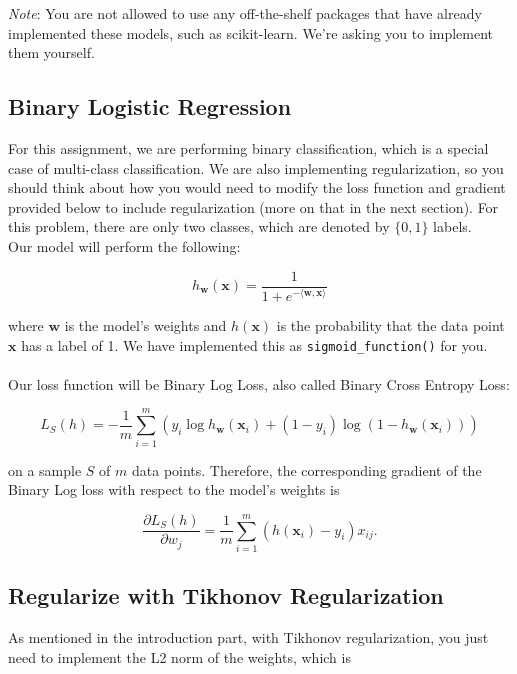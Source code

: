 \documentclass{article}
\begin{document}
\noindent\textit{Note}: You are not allowed to use any off-the-shelf packages that have already implemented these models, such as scikit-learn. We're asking you to implement them yourself.

\subsection*{Binary Logistic Regression}

For this assignment, we are performing binary classification, which is a special case of multi-class classification. We are also implementing regularization, so you should think about how you would need to modify the loss function and gradient provided below to include regularization (more on that in the next section). For this problem, there are only two classes, which are denoted by $\{0, 1\}$ labels. \\

\noindent Our model will perform the following: 

\begin{equation}
    h_\mathbf{w}(\mathbf{x}) = \frac{1}{1 + e^{-\langle\mathbf{w}, \mathbf{x}\rangle}}
    \label{eq:sigmoid}
\end{equation}

\noindent where $\mathbf{w}$ is the model's weights and $h(\mathbf{x})$ is the probability that the data point $\mathbf{x}$ has a label of 1. We have implemented this as \texttt{sigmoid\_function()} for you. \\ \\
Our loss function will be Binary Log Loss, also called Binary Cross Entropy Loss:

\begin{equation}
    L_S(h) = -\frac{1}{m} \sum_{i=1}^m (y_i \log h_\mathbf{w}(\mathbf{x}_i) + (1 - y_i)\log (1 - h_\mathbf{w}(\mathbf{x}_i))) 
    \label{eq:binaryce}
\end{equation}

\noindent on a sample $S$ of $m$ data points. Therefore, the corresponding gradient of the Binary Log loss with respect to the model's weights is 

\begin{equation}
    \frac{\partial L_S(h)}{\partial w_j} = \frac{1}{m} \sum_{i=1}^m (h(\mathbf{x}_i) - y_i)x_{ij}.
    \label{eq:binarycegrad}
\end{equation}

\subsection*{Regularize with Tikhonov Regularization}
As mentioned in the introduction part, with Tikhonov regularization, you just need to implement the L2 norm of the weights, which is 
\end{document}
